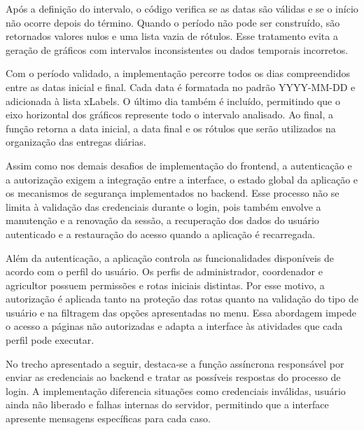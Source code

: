 Após a definição do intervalo, o código verifica se as datas são válidas e se o início não ocorre depois do término. Quando o período não pode ser construído, são retornados valores nulos e uma lista vazia de rótulos. Esse tratamento evita a geração de gráficos com intervalos inconsistentes ou dados temporais incorretos.

Com o período validado, a implementação percorre todos os dias compreendidos entre as datas inicial e final. Cada data é formatada no padrão YYYY-MM-DD e adicionada à lista xLabels. O último dia também é incluído, permitindo que o eixo horizontal dos gráficos represente todo o intervalo analisado. Ao final, a função retorna a data inicial, a data final e os rótulos que serão utilizados na organização das entregas diárias.

Assim como nos demais desafios de implementação do frontend, a autenticação e a autorização exigem a integração entre a interface, o estado global da aplicação e os mecanismos de segurança implementados no backend. Esse processo não se limita à validação das credenciais durante o login, pois também envolve a manutenção e a renovação da sessão, a recuperação dos dados do usuário autenticado e a restauração do acesso quando a aplicação é recarregada.

Além da autenticação, a aplicação controla as funcionalidades disponíveis de acordo com o perfil do usuário. Os perfis de administrador, coordenador e agricultor possuem permissões e rotas iniciais distintas. Por esse motivo, a autorização é aplicada tanto na proteção das rotas quanto na validação do tipo de usuário e na filtragem das opções apresentadas no menu. Essa abordagem impede o acesso a páginas não autorizadas e adapta a interface às atividades que cada perfil pode executar.

No trecho apresentado a seguir, destaca-se a função assíncrona responsável por enviar as credenciais ao backend e tratar as possíveis respostas do processo de login. A implementação diferencia situações como credenciais inválidas, usuário ainda não liberado e falhas internas do servidor, permitindo que a interface apresente mensagens específicas para cada caso. 

